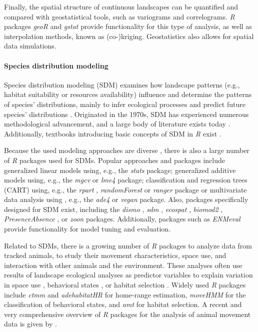 \documentclass[smallextended]{svjour3}       %
\begin{document}
Finally, the spatial structure of continuous landscapes can be quantified and compared with geostatistical tools, such as variograms and correlograms.
\textit{R} packages \textit{geoR} \cite{Diggle2007} and \textit{gstat} \cite{Pebesma2004} provide functionality for this type of analysis, as well as interpolation methods, known as (co-)kriging.
Geostatistics also allows for spatial data simulations.

\hypertarget{sec:SDM}{%
\paragraph{Species distribution modeling}\label{sec:SDM}}

Species distribution modeling (SDM) examines how landscape patterns (e.g., habitat suitability or resources availability) influence and determine the patterns of species' distributions, mainly to infer ecological processes and predict future species' distributions \cite{Wiersma2011}.
Originated in the 1970s, SDM has experienced numerous methodological advancement, and a large body of literature exists today \cite{Zimmermann2010,Norberg2019}.
Additionally, textbooks introducing basic concepts of SDM in \textit{R} exist \cite{Guisan2017,Fletcher2018}.

Because the used modeling approaches are diverse \cite{Hooten2011,Kerr2011,Fletcher2018}, there is also a large number of \textit{R} packages used for SDMs.
Popular approaches and packages include generalized linear models using, e.g., the \textit{stats} \cite{RCoreTeam2019} package; generalized additive models using, e.g., the \textit{mgcv} \cite{Wood2017} or \textit{lme4} \cite{Bates2015} package; classification and regression trees (CART) using, e.g., the \textit{rpart} \cite{Therneau2019}, \textit{randomForest} \cite{Liaw2002} or \textit{ranger} \cite{Wright2017} package or multivariate data analysis using , e.g., the \textit{ade4} \cite{Dray2007} or \textit{vegan} \cite{Oksanen2019} package.
Also, packages specifically designed for SDM exist, including the \textit{dismo} \cite{Hijmans2017}, \textit{sdm} \cite{Naimi2016}, \textit{ecospat} \cite{Broennimann2020}, \textit{biomod2} \cite{Thuiller2020}, \textit{PresenceAbsence} \cite{Freeman2008}, or \textit{zoon} \cite{Golding2018} packages.
Additionally, packages such as \textit{ENMeval} \cite{Muscarella2014} provide functionality for model tuning and evaluation.

Related to SDMs, there is a growing number of \textit{R} packages to analyze data from tracked animals, to study their movement characteristics, space use, and interaction with other animals and the environment.
These analyses often use results of landscape ecological analyses as predictor variables to explain variation in space use \cite{Signer2015}, behavioral states \cite{Langrock2012}, or habitat selection \cite{Fieberg2020}.
Widely used \textit{R} packages include \textit{ctmm} \cite{Calabrese2016} and \textit{adehabitatHR} \cite{Calenge2006} for home-range estimation, \textit{moveHMM} \cite{Michelot2016} for the classification of behavioral states, and \textit{amt} \cite{Signer2019} for habitat selection.
A recent and very comprehensive overview of \textit{R} packages for the analysis of animal movement data is given by \cite{Joo2020}.
\end{document}
